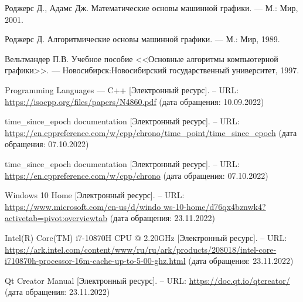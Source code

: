 
\renewcommand\bibname{СПИСОК ИСПОЛЬЗОВАННЫХ ИСТОЧНИКОВ}
\begin{thebibliography}{}

 Роджерс Д., Адамс Дж. Математические основы машинной графики. --- М.: Мир, 2001.

 Роджерс Д. Алгоритмические основы машинной графики. --- М.: Мир, 1989.

 Вельтмандер П.В. Учебное пособие <<Основные алгоритмы компьютерной графики>>. –-- Новосибирск:Новосибирский государственный университет, 1997.

 Programming Languages –-- C++ [Электронный ресурс]. -- URL: \url{https://isocpp.org/files/papers/N4860.pdf} (дата обращения: 10.09.2022)

 time\_since\_epoch documentation [Электронный ресурс]. -- URL: \url{https://en.cppreference.com/w/cpp/chrono/time_point/time_since_epoch} (дата обращения: 07.10.2022)

 time\_since\_epoch documentation [Электронный ресурс]. -- URL: \url{https://en.cppreference.com/w/cpp/chrono} (дата обращения: 07.10.2022)

 Windows 10 Home [Электронный ресурс]. -- URL: \url{https://www.microsoft.com/en-us/d/windo ws-10-home/d76qx4bznwk4?activetab=pivot:overviewtab} (дата обращения: 23.11.2022)

 Intel(R) Core(TM) i7-10870H CPU @ 2.20GHz [Электронный ресурс]. -- URL: \url{https://ark.intel.com/content/www/ru/ru/ark/products/208018/intel-core-i710870h-processor-16m-cache-up-to-5-00-ghz.html} (дата обращения: 23.11.2022)

 Qt Creator Manual [Электронный ресурс]. -- URL: \url{https://doc.qt.io/qtcreator/} (дата обращения: 23.11.2022)

\end{thebibliography}